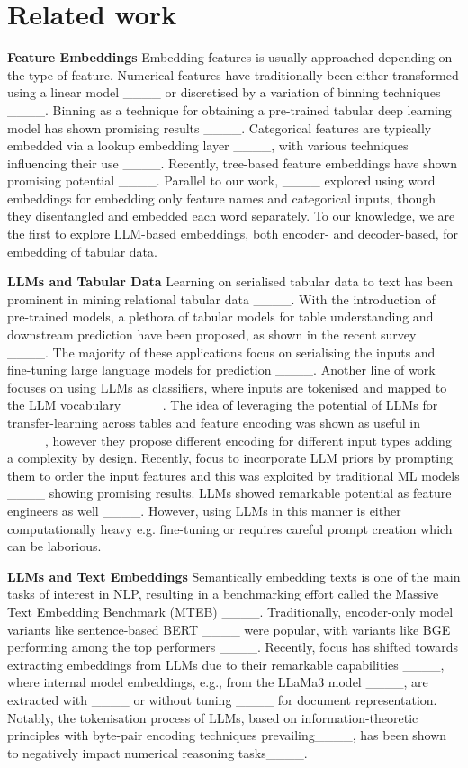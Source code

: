 \section{Related work}
\textbf{Feature Embeddings} Embedding features is usually approached depending on the type of feature. Numerical features have traditionally been either transformed using a linear model ____ or discretised by a variation of binning techniques ____. Binning as a technique for obtaining a pre-trained tabular deep learning model has shown promising results ____. Categorical features are typically embedded via a lookup embedding layer ____, with various techniques influencing their use ____. Recently, tree-based feature embeddings have shown promising potential ____. Parallel to our work, ____ explored using word embeddings for embedding only feature names and categorical inputs, though they disentangled and embedded each word separately. To our knowledge, we are the first to explore LLM-based embeddings, both encoder- and decoder-based, for embedding of tabular data.


\textbf{LLMs and Tabular Data} Learning on serialised tabular data to text has been prominent in mining relational tabular data ____. With the introduction of pre-trained models, a plethora of tabular models for table understanding and downstream prediction have been proposed, as shown in the recent survey ____. The majority of these applications focus on serialising the inputs and fine-tuning large language models for prediction ____. Another line of work focuses on using LLMs as classifiers, where inputs are tokenised and mapped to the LLM vocabulary ____. The idea of leveraging the potential of LLMs for transfer-learning across tables and feature encoding was shown as useful in ____, however they propose different encoding for different input types adding a complexity by design. Recently, focus to incorporate LLM priors by prompting them to order the input features and this was exploited by traditional ML models ____ showing promising results. LLMs showed remarkable potential as feature engineers as well ____. However, using LLMs in this manner is either computationally heavy e.g. fine-tuning or requires careful prompt creation which can be laborious. 

\textbf{LLMs and Text Embeddings} Semantically embedding texts is one of the main tasks of interest in NLP, resulting in a benchmarking effort called the Massive Text Embedding Benchmark (MTEB) ____. Traditionally, encoder-only model variants like sentence-based BERT ____ were popular, with variants like BGE performing among the top performers ____. Recently, focus has shifted towards extracting embeddings from LLMs due to their remarkable capabilities ____, where internal model embeddings, e.g., from the LLaMa3 model ____, are extracted with ____ or without tuning ____ for document representation. Notably, the tokenisation process of LLMs, based on information-theoretic principles with byte-pair encoding techniques prevailing____, has been shown to negatively impact numerical reasoning tasks____.